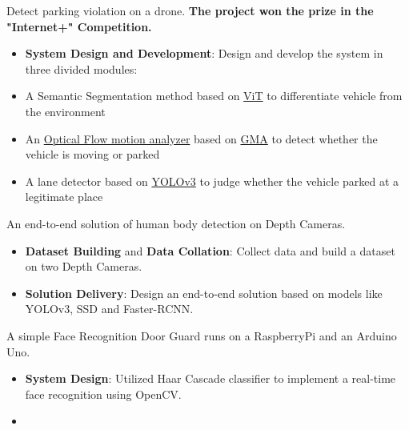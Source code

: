 \documentclass{resume}
\begin{document}
Detect parking violation on a drone. \textbf{The project won the  prize in the "Internet+" Competition.}
\begin{itemize}
    \item \textbf{System Design and Development}: Design and develop the system in three divided modules:
    \item A Semantic Segmentation method based on \href{https://arxiv.org/abs/2205.08534v3}{ViT} to differentiate vehicle from the environment
    \item An \href{https://github.com/open-mmlab/mmflow}{Optical Flow motion analyzer} based on \href{https://arxiv.org/abs/2104.02409}{GMA} to detect whether the vehicle is moving or parked
    \item A lane detector based on \href{https://arxiv.org/abs/1804.02767}{YOLOv3} to judge whether the vehicle parked at a legitimate place
\end{itemize}

An end-to-end solution of human body detection on Depth Cameras.
\begin{itemize}
    \item \textbf{Dataset Building} and \textbf{Data Collation}: Collect data and build a dataset on two Depth Cameras.
    \item \textbf{Solution Delivery}: Design an end-to-end solution based on models like YOLOv3, SSD and Faster-RCNN.
\end{itemize}

A simple Face Recognition Door Guard runs on a RaspberryPi and an Arduino Uno.
\begin{itemize}
    \item \textbf{System Design}: Utilized Haar Cascade classifier to implement a real-time face recognition using OpenCV. 
    \item {}
\end{itemize}
\end{document}
